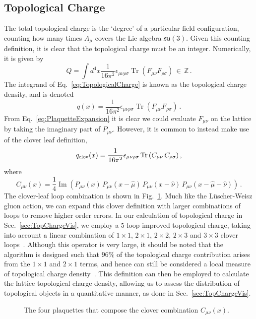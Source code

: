 \subsection{Topological Charge}\label{sec:TopQ}
The total topological charge is the `degree' of a particular field configuration, counting how many times $A_\mu$ covers the Lie algebra $\mathfrak{su}(3)$. Given this counting definition, it is clear that the topological charge must be an integer. Numerically, it is given by~\cite{Alexandrou:2017hqw}
%
\begin{equation}
Q = \int d^4x \frac { 1 } { 16 \pi ^ { 2 } } \epsilon _ { \mu \nu \rho \sigma } \operatorname { Tr } \left( F _ { \mu \nu } F _ { \rho \sigma } \right)\, \in\, \mathbb{Z} \, .
\label{eq:TopologicalCharge}
\end{equation} 
The integrand of Eq.~\eqref{eq:TopologicalCharge} is known as the topological charge density, and is denoted
%
\begin{equation}
q(x) = \frac { 1 } { 16 \pi ^ { 2 } } \epsilon _ { \mu \nu \rho \sigma } \operatorname { Tr } \left( F _ { \mu \nu } F _ { \rho \sigma } \right)\, .
\end{equation}
%
From Eq.~\eqref{eq:PlaquetteExpansion} it is clear we could evaluate $F_{\mu\nu}$ on the lattice by taking the imaginary part of $P_{\mu\nu}$. However, it is common to instead make use of the clover leaf definition,
%
\begin{equation}
q_\text{clov}(x) = \frac{1}{16\pi^2} \epsilon _ { \mu \nu \rho \sigma } \operatorname{Tr}\left(C_{\mu\nu} \, C_{\rho\sigma}\right),
\end{equation}
%
where
\begin{equation}
C_{\mu\nu}(x) = \frac{1}{4} \operatorname{Im}\left(P_{\mu\nu}(x) \, P_{\mu\nu}(x-\hat{\mu}) \, P_{\mu\nu}(x - \hat{\nu}) \, P_{\mu\nu}(x - \hat{\mu} - \hat{\nu})\right)\, .
\end{equation}
%
The clover-leaf loop combination is shown in Fig.~\ref{fig:Clover}. Much like the L\"uscher-Weisz gluon action, we can expand this clover definition with larger combinations of loops to remove higher order errors. In our calculation of topological charge in Sec.~\ref{sec:TopChargeVis}, we employ a 5-loop improved topological charge, taking into account a linear combination of $1\times 1$, $2\times 1$, $2\times 2$, $2\times 3$ and $3\times 3$ clover loops~\cite{BilsonThompson:2001ca}. Although this operator is very large, it should be noted that the algorithm is designed such that 96\% of the topological charge contribution arises from the $1\times 1$ and $2\times 1$ terms, and hence can still be considered a local measure of topological charge density~\cite{BilsonThompson:2002jk}. This definition can then be employed to calculate the lattice topological charge density, allowing us to assess the distribution of topological objects in a quantitative manner, as done in Sec.~\ref{sec:TopChargeVis}.
%
\begin{figure}[H]
\centering
\scalebox{0.9}{}
\caption{\label{fig:Clover}The four plaquettes that compose the clover combination $C_{\mu\nu}(x)$.}
\end{figure}
%

